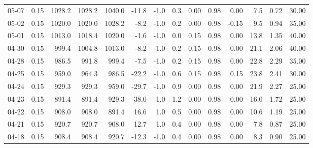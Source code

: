 \begin{threeparttable}
{\begin{tabular}{lrrrrrrrrrrrrr}
  05-07 &     0.15 & 1028.2 & 1028.2 & 1040.0 &      -11.8 &                     -1.0 &                 0.3 &       0.00 &      0.98 &           0.00 &              7.5 &            0.72 &                  30.00 \\
  05-02 &     0.15 & 1020.0 & 1020.0 & 1028.2 &       -8.2 &                     -1.0 &                 0.2 &       0.00 &      0.98 &          -0.15 &              9.5 &            0.94 &                  35.00 \\
  05-01 &     0.15 & 1013.0 & 1018.4 & 1020.0 &       -1.6 &                     -1.0 &                 0.0 &       0.15 &      0.98 &           0.00 &             13.8 &            1.35 &                  40.00 \\
  04-30 &     0.15 &  999.4 & 1004.8 & 1013.0 &       -8.2 &                     -1.0 &                 0.2 &       0.15 &      0.98 &           0.00 &             21.1 &            2.06 &                  40.00 \\
  04-28 &     0.15 &  986.5 &  991.8 &  999.4 &       -7.5 &                     -1.0 &                 0.2 &       0.15 &      0.98 &           0.00 &             22.8 &            2.29 &                  35.00 \\
  04-25 &     0.15 &  959.0 &  964.3 &  986.5 &      -22.2 &                     -1.0 &                 0.6 &       0.15 &      0.98 &           0.15 &             23.8 &            2.41 &                  30.00 \\
  04-24 &     0.15 &  929.3 &  929.3 &  959.0 &      -29.7 &                     -1.0 &                 0.9 &       0.00 &      0.98 &           0.00 &             21.9 &            2.27 &                  25.00 \\
  04-23 &     0.15 &  891.4 &  891.4 &  929.3 &      -38.0 &                     -1.0 &                 1.2 &       0.00 &      0.98 &           0.00 &             16.0 &            1.72 &                  25.00 \\
  04-22 &     0.15 &  908.0 &  908.0 &  891.4 &       16.6 &                      1.0 &                 0.5 &       0.00 &      0.98 &           0.00 &             10.6 &            1.19 &                  25.00 \\
  04-21 &     0.15 &  920.7 &  920.7 &  908.0 &       12.7 &                      1.0 &                 0.4 &       0.00 &      0.98 &           0.00 &              7.8 &            0.87 &                  25.00 \\
  04-18 &     0.15 &  908.4 &  908.4 &  920.7 &      -12.3 &                     -1.0 &                 0.4 &       0.00 &      0.98 &           0.00 &              8.3 &            0.90 &                  25.00 \\

\end{tabular}}
\end{threeparttable}

